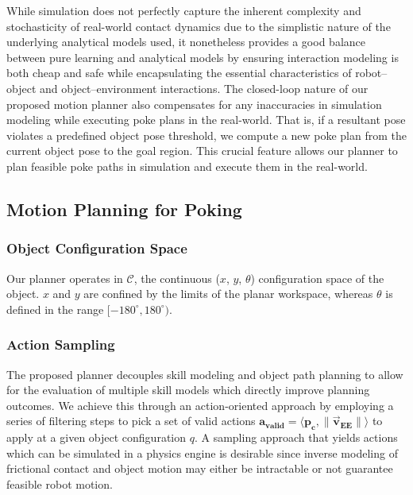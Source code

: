 While simulation does not perfectly capture the inherent complexity and stochasticity of real-world contact dynamics due to the simplistic nature of the underlying analytical models used, it nonetheless provides a good balance between pure learning and analytical models by ensuring interaction modeling is both cheap and safe while encapsulating the essential characteristics of robot--object and object--environment interactions. The closed-loop nature of our proposed motion planner also compensates for any inaccuracies in simulation modeling while executing poke plans in the real-world. That is, if a resultant pose violates a predefined object pose threshold, we compute a new poke plan from the current object pose to the goal region. This crucial feature allows our planner to plan feasible poke paths in simulation and execute them in the real-world.

\subsection{Motion Planning for Poking}
\label{sec:poking:rrt}

\subsubsection{Object Configuration Space}

Our planner operates in $\mathcal{C}$, the continuous ($x$, $y$, $\theta$) configuration space of the object. $x$ and $y$ are confined by the limits of the planar workspace, whereas $\theta$ is defined in the range $[-180^\circ, 180^\circ)$.

\subsubsection{Action Sampling}
\label{sec:poking:action}

The proposed planner decouples skill modeling and object path planning to allow for the evaluation of multiple skill models which directly improve planning outcomes. We achieve this through an action-oriented approach by employing a series of filtering steps to pick a set of valid actions $\boldsymbol{a_{valid}} = \langle \boldsymbol{p_c}, \boldsymbol{\|\vec{v}_{EE}\|}\rangle$ to apply at a given object configuration $q$. A sampling approach that yields actions which can be simulated in a physics engine is desirable since inverse modeling of frictional contact and object motion may either be intractable or not guarantee feasible robot motion.

